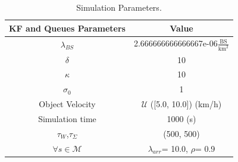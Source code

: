 \begin{table}[H]\centering
\caption{Simulation Parameters.}
\label{tab:Simulation Parameters}
\begin{tabular}{|c|c|}
\toprule
\textbf{KF and Queues Parameters} & \textbf{Value} \\
\midrule
$\lambda_{BS}$ & 2.666666666666667e-06$\frac{\text{BS}}{\text{km}^2}$ \\
$\delta$ & 10 \\
$\kappa$ & 10 \\
$\sigma_0$ & 1 \\
Object Velocity & $ \mathcal{U} $ ([5.0, 10.0]) (km/h) \\
Simulation time & 1000 (s) \\
$\tau_W$,$\tau_\Sigma$ & (500, 500) \\
$\forall s \in \mathcal{M}$ & $\lambda_{arr}$= 10.0, $\rho$= 0.9 \\
\bottomrule
\end{tabular}
\end{table}
